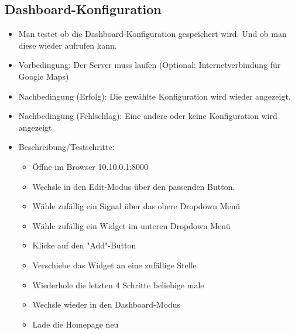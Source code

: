 \documentclass[qualitaetssicherung.tex]{subfiles}
\begin{document}
	\subsection{Dashboard-Konfiguration}
		\begin{itemize}
			\item
			Man testet ob die Dashboard-Konfiguration gespeichert wird. Und ob man diese wieder aufrufen kann.
			\item
			Vorbedingung: Der Server muss laufen (Optional: Internetverbindung für Google Maps)
			\item
			Nachbedingung (Erfolg): Die gewählte Konfiguration wird wieder angezeigt.
			\item
			Nachbedingung (Fehlschlag): Eine andere oder keine Konfiguration wird angezeigt
			\item
			Beschreibung/Testschritte:
			\begin{itemize}
				\item
				Öffne im Browser 10.10.0.1:8000
				\item
				Wechsle in den Edit-Modus über den passenden Button.
				\item
				Wähle zufällig ein Signal über das obere Dropdown Menü
				\item
				Wähle zufällig ein Widget im unteren Dropdown Menü
				\item
				Klicke auf den "Add"-Button
				\item
				Verschiebe das Widget an eine zufällige Stelle
				\item
				Wiederhole die letzten 4 Schritte beliebige male
				\item 
				Wechsle wieder in den Dashboard-Modus
				\item
				Lade die Homepage neu
			\end{itemize}
		\end{itemize}
		
\end{document}
